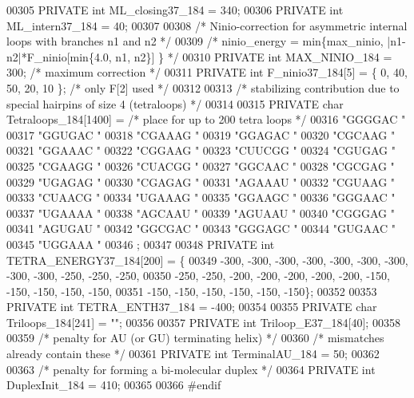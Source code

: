 \begin{DoxyCode}
00305 PRIVATE \textcolor{keywordtype}{int} ML\_closing37\_184 = 340;
00306 PRIVATE \textcolor{keywordtype}{int} ML\_intern37\_184 =  40;
00307 
00308 \textcolor{comment}{/* Ninio-correction for asymmetric internal loops with branches n1 and n2 */}
00309 \textcolor{comment}{/*    ninio\_energy = min\{max\_ninio, |n1-n2|*F\_ninio[min\{4.0, n1, n2\}] \} */}
00310 PRIVATE \textcolor{keywordtype}{int} MAX\_NINIO\_184 = 300;                   \textcolor{comment}{/* maximum correction */}
00311 PRIVATE \textcolor{keywordtype}{int} F\_ninio37\_184[5] = \{ 0, 40, 50, 20, 10 \};      \textcolor{comment}{/* only F[2] used */}
00312 
00313 \textcolor{comment}{/* stabilizing contribution due to special hairpins of size 4 (tetraloops) */}
00314 
00315 PRIVATE \textcolor{keywordtype}{char} Tetraloops\_184[1400] =  \textcolor{comment}{/* place for up to 200 tetra loops */}
00316   \textcolor{stringliteral}{"GGGGAC "}
00317   \textcolor{stringliteral}{"GGUGAC "}
00318   \textcolor{stringliteral}{"CGAAAG "}
00319   \textcolor{stringliteral}{"GGAGAC "}
00320   \textcolor{stringliteral}{"CGCAAG "}
00321   \textcolor{stringliteral}{"GGAAAC "}
00322   \textcolor{stringliteral}{"CGGAAG "}
00323   \textcolor{stringliteral}{"CUUCGG "}
00324   \textcolor{stringliteral}{"CGUGAG "}
00325   \textcolor{stringliteral}{"CGAAGG "}
00326   \textcolor{stringliteral}{"CUACGG "}
00327   \textcolor{stringliteral}{"GGCAAC "}
00328   \textcolor{stringliteral}{"CGCGAG "}
00329   \textcolor{stringliteral}{"UGAGAG "}
00330   \textcolor{stringliteral}{"CGAGAG "}
00331   \textcolor{stringliteral}{"AGAAAU "}
00332   \textcolor{stringliteral}{"CGUAAG "}
00333   \textcolor{stringliteral}{"CUAACG "}
00334   \textcolor{stringliteral}{"UGAAAG "}
00335   \textcolor{stringliteral}{"GGAAGC "}
00336   \textcolor{stringliteral}{"GGGAAC "}
00337   \textcolor{stringliteral}{"UGAAAA "}
00338   \textcolor{stringliteral}{"AGCAAU "}
00339   \textcolor{stringliteral}{"AGUAAU "}
00340   \textcolor{stringliteral}{"CGGGAG "}
00341   \textcolor{stringliteral}{"AGUGAU "}
00342   \textcolor{stringliteral}{"GGCGAC "}
00343   \textcolor{stringliteral}{"GGGAGC "}
00344   \textcolor{stringliteral}{"GUGAAC "}
00345   \textcolor{stringliteral}{"UGGAAA "}
00346 ;
00347 
00348 PRIVATE \textcolor{keywordtype}{int}   TETRA\_ENERGY37\_184[200] = \{
00349   -300, -300, -300, -300, -300, -300, -300, -300, -300, -250, -250, -250,
00350   -250, -250, -200, -200, -200, -200, -200, -150, -150, -150, -150, -150,
00351   -150, -150, -150, -150, -150, -150\};
00352 
00353 PRIVATE \textcolor{keywordtype}{int}   TETRA\_ENTH37\_184   = -400;
00354 
00355 PRIVATE \textcolor{keywordtype}{char} Triloops\_184[241] = \textcolor{stringliteral}{""};
00356 
00357 PRIVATE \textcolor{keywordtype}{int} Triloop\_E37\_184[40];
00358 
00359 \textcolor{comment}{/* penalty for AU (or GU) terminating helix) */}
00360 \textcolor{comment}{/* mismatches already contain these */}
00361 PRIVATE \textcolor{keywordtype}{int} TerminalAU\_184 = 50;
00362 
00363 \textcolor{comment}{/* penalty for forming a bi-molecular duplex */}
00364 PRIVATE \textcolor{keywordtype}{int} DuplexInit\_184 = 410;
00365 
00366 \textcolor{preprocessor}{#endif}
\end{DoxyCode}
